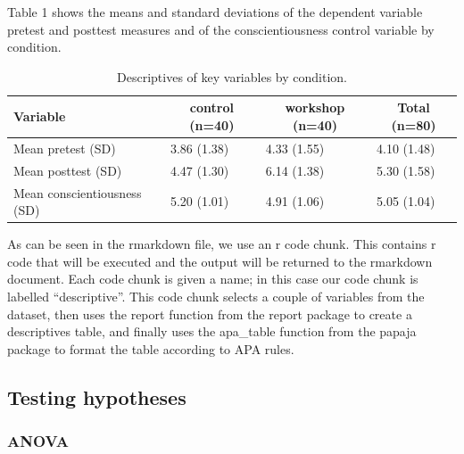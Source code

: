 \documentclass[
  man]{apa6}
\begin{document}
Table 1 shows the means and standard deviations of the dependent variable pretest and posttest measures and of the conscientiousness control variable by condition.

\begin{table}[tbp]

\begin{center}
\begin{threeparttable}

\caption{\label{tab:descriptive}Descriptives of key variables by condition.}

\begin{tabular}{llll}
\toprule
Variable & \multicolumn{1}{c}{control (n=40)} & \multicolumn{1}{c}{workshop (n=40)} & \multicolumn{1}{c}{Total (n=80)}\\
\midrule
Mean pretest (SD) & 3.86 (1.38) & 4.33 (1.55) & 4.10 (1.48)\\
Mean posttest (SD) & 4.47 (1.30) & 6.14 (1.38) & 5.30 (1.58)\\
Mean conscientiousness (SD) & 5.20 (1.01) & 4.91 (1.06) & 5.05 (1.04)\\
\bottomrule
\end{tabular}

\end{threeparttable}
\end{center}

\end{table}

As can be seen in the rmarkdown file, we use an r code chunk. This contains r code that will be executed and the output will be returned to the rmarkdown document. Each code chunk is given a name; in this case our code chunk is labelled ``descriptive''. This code chunk selects a couple of variables from the dataset, then uses the report function from the report package to create a descriptives table, and finally uses the apa\_table function from the papaja package to format the table according to APA rules.

\hypertarget{testing-hypotheses}{%
\subsection{Testing hypotheses}\label{testing-hypotheses}}

\hypertarget{anova}{%
\subsubsection{ANOVA}\label{anova}}
\end{document}
